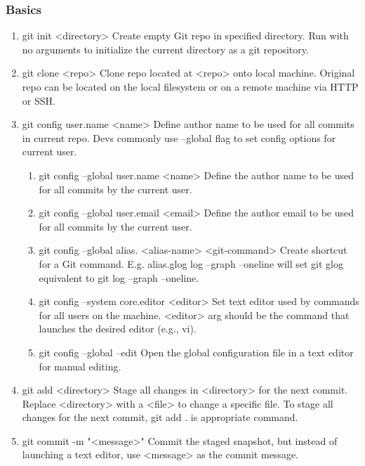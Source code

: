 \documentclass[11pt]{article}
\begin{document}
\subsubsection{Basics}
\label{sec:orga6d9ee9}
\begin{enumerate}
\item git init <directory>
\label{sec:org7a08c42}
Create empty Git repo in specified directory. Run with no arguments
to initialize the current directory as a git repository.
\item git clone <repo>
\label{sec:orga6549d5}
Clone repo located at <repo> onto local machine. Original repo can be
located on the local filesystem or on a remote machine via HTTP or SSH.
\item git config user.name <name>
\label{sec:org9e4ea75}
Define author name to be used for all commits in current repo. Devs
commonly use --global flag to set config options for current user.
\begin{enumerate}
\item git config --global user.name <name>
\label{sec:org0c9f948}
Define the author name to be used for all commits by the current user.
\item git config --global user.email <email>
\label{sec:org067259f}
Define the author email to be used for all commits by the current user.
\item git config --global alias. <alias-name> <git-command>
\label{sec:orge6dda8c}
Create shortcut for a Git command. E.g. alias.glog log --graph
--oneline will set git glog equivalent to git log --graph --oneline.
\item git config --system core.editor <editor>
\label{sec:org51ddcf6}
Set text editor used by commands for all users on the machine. <editor>
arg should be the command that launches the desired editor (e.g., vi).
\item git config --global --edit
\label{sec:org45f95fa}
Open the global configuration file in a text editor for manual editing.
\end{enumerate}
\item git add <directory>
\label{sec:org86c525c}
Stage all changes in <directory> for the next commit.
Replace <directory> with a <file> to change a specific file. To stage all changes for the next commit, git add . is appropriate command.
\item git commit -m "<message>"
\label{sec:org398efcb}
Commit the staged snapshot, but instead of launching a text editor,
use <message> as the commit message.
\begin{enumerate}

\end{enumerate}
\end{enumerate}
\end{document}
